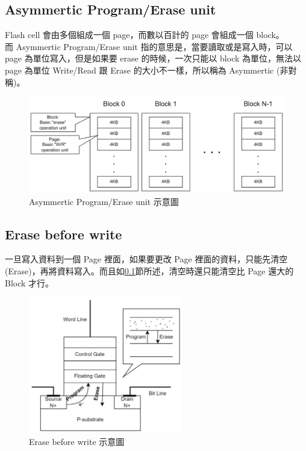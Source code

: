 \subsection{Asymmertic Program/Erase unit}\label{s2.1.2}
\indent
Flash cell 會由多個組成一個 page，而數以百計的 page 會組成一個 block。\\
而 Asymmertic Program/Erase unit 指的意思是，當要讀取或是寫入時，可以 page 為單位寫入，但是如果要 erase 的時候，一次只能以 block 為單位，無法以 page 為單位 Write/Read 跟 Erase 的大小不一樣，所以稱為 Asymmertic (非對稱)。
\begin{figure}[H]
    \centering
    \includegraphics[width=1\textwidth]{picture/ch2/Asymmertic_P-E_unit.png}
    \caption{Asymmertic Program/Erase unit 示意圖}
    \label{f2.1}
\end{figure}

\subsection{Erase before write}\label{s2.1.3}
\indent
一旦寫入資料到一個 Page 裡面，如果要更改 Page 裡面的資料，只能先清空(Erase)，再將資料寫入。而且如\ref{s2.1.2}節所述，清空時還只能清空比 Page 還大的 Block 才行。\cite{SRFTL}
\begin{figure}[H]
    \centering
    \includegraphics[width=0.6\textwidth]{picture/ch2/erase_before_write.png}
    \caption{Erase before write 示意圖}
    \label{f2.2}
\end{figure}

